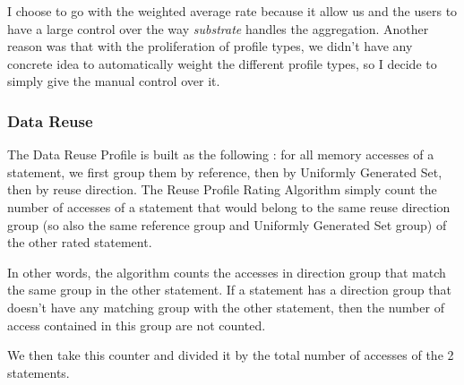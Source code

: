 \documentclass[paper=a4, fontsize=11.5pt]{scrartcl}
\numberwithin{equation}{section}        %
\numberwithin{figure}{section}          %
\numberwithin{table}{section}               %
\begin{document}
    I choose to go with the weighted average rate because it allow us and the users
    to have a large control over the way \textit{substrate} handles the aggregation.
    Another reason was that with the proliferation of profile types, we didn't have
    any concrete idea to automatically weight the different profile types, so I decide
    to simply give the manual control over it.
        \subsubsection{Data Reuse}
            The Data Reuse Profile is built as the following : for all memory accesses of
            a statement, we first group them by reference, then by Uniformly Generated Set,
            then by reuse direction. The Reuse Profile Rating Algorithm simply count
            the number of accesses of a statement that would belong to the same reuse
            direction group (so also the same reference group and Uniformly Generated Set group)
            of the other rated statement.
            
            In other words, the algorithm counts the accesses in direction group that match
            the same group in the other statement. If a statement has a direction group that doesn't
            have any matching group with the other statement, then the number of access contained
            in this group are not counted.

            We then take this counter and divided it by the total number of accesses of
            the 2 statements.
\end{document}
